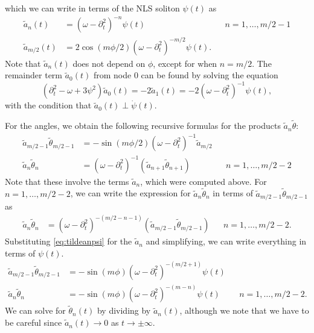 \documentclass[11pt,reqno]{amsart}
\begin{document}
which we can write in terms of the NLS soliton $\psi(t)$ as
\begin{equation}\label{eq:tildeanpsi}
\begin{aligned}
\tilde{a}_n(t) &= (\omega - \partial_t^2)^{-n} \psi(t) && n = 1, \dots, m/2-1 \\
\tilde{a}_{m/2}(t) &= 2 \cos( m\phi/2)(\omega - \partial_t^2)^{-m/2} \psi(t).
\end{aligned}
\end{equation}
Note that $\tilde{a}_n(t)$ does not depend on $\phi$, except for when $n=m/2$. The remainder term $\tilde{a}_0(t)$ from node 0 can be found by solving the equation
\begin{equation}\label{eq:tildea0eq}
\left( \partial_t^2 - \omega + 3 \psi^2 \right) \tilde{a}_0(t) = -2 \tilde{a}_1(t) =
-2 (\omega - \partial_t^2)^{-1} \psi(t),
\end{equation}
with the condition that $\tilde{a}_0(t) \perp \dot \psi(t)$.

For the angles, we obtain the following recursive formulas for the products $\tilde{a}_n \tilde{\theta}$:
\begin{equation}\label{eq:tildeantn}
\begin{aligned}
\tilde{a}_{m/2-1} \tilde{\theta}_{m/2-1} &= -\sin(m \phi/2) (\omega - \partial_t^2)^{-1} \tilde{a}_{m/2} \\
\tilde{a}_n \tilde{\theta}_n &= (\omega - \partial_t^2)^{-1} \left( \tilde{a}_{n+1} \tilde{\theta}_{n+1} \right) && n = 1, \dots, m/2-2
\end{aligned}
\end{equation}
Note that these involve the terms $\tilde{a}_n$, which were computed above. For $n = 1, \dots, m/2-2$, we can write the expression for $\tilde{a}_n \tilde{\theta}_n$ in terms of $\tilde{a}_{m/2-1} \tilde{\theta}_{m/2-1}$ as
\begin{align*}
\tilde{a}_n \tilde{\theta}_n &= (\omega - \partial_t^2)^{-(m/2-n-1)} \left( \tilde{a}_{m/2-1} \tilde{\theta}_{m/2-1} \right) && n = 1, \dots, m/2-2.
\end{align*}
Substituting \cref{eq:tildeanpsi} for the $\tilde{a}_n$ and simplifying, we can write everything in terms of $\psi(t)$.
\begin{equation}\label{eq:tildeantnpsi}
\begin{aligned}
\tilde{a}_{m/2-1} \tilde{\theta}_{m/2-1} &= -\sin(m \phi) (\omega - \partial_t^2)^{-(m/2+1)} \psi(t)  \\
\tilde{a}_n \tilde{\theta}_n &= -\sin(m \phi) (\omega - \partial_t^2)^{-(m-n)} \psi(t) && n = 1, \dots, m/2-2.
\end{aligned}
\end{equation}
We can solve for $\tilde{\theta}_n(t)$ by dividing by $\tilde{a}_n(t)$, although we note that we have to be careful since $\tilde{a}_n(t) \rightarrow 0$ as $t \rightarrow \pm \infty$.
\end{document}
